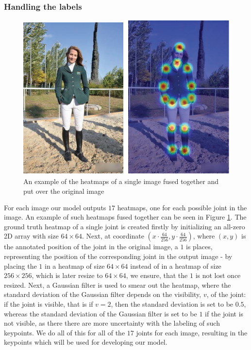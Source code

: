 \documentclass[./main.tex]{subfiles}
\begin{document}
\subsubsection{Handling the labels}
\begin{figure}[htbp]
    \centering
    \includegraphics[height = 4 cm]{./entities/heatmaps_ex.PNG}
    \caption{An example of the heatmaps of a single image fused together and put over the original image \cite{survey_1}}
    \label{fig:heatmaps_ex}
\end{figure}
\noindent For each image our model outputs $17$ heatmaps, one for each possible joint in the image. An example of such heatmaps fused together can be seen in Figure \ref{fig:heatmaps_ex}. The ground truth heatmap of a single joint is created firstly by initializing an all-zero 2D array with size $64 \times 64$. Next, at coordinate $\left( x \cdot \frac{64}{256}, y \cdot \frac{64}{256} \right)$, where $(x, y)$ is the annotated position of the joint in the original image, a $1$ is places, representing the position of the corresponding joint in the output image - by placing the $1$ in a heatmap of size $64 \times 64$ instead of in a heatmap of size $256 \times 256$, which is later resize to $64 \times 64$, we ensure, that the $1$ is not lost once resized. Next, a Gaussian filter is used to smear out the heatmap, where the standard deviation of the Gaussian filter depends on the visibility, $v$, of the joint: if the joint is visible, that is if $v = 2$, then the standard deviation is set to be $0.5$, whereas the standard deviation of the Gaussian filter is set to be $1$ if the joint is not visible, as there there are more uncertainty with the labeling of such keypoints. We do all of this for all of the $17$ joints for each image, resulting in the keypoints which will be used for developing our model.
\end{document}
